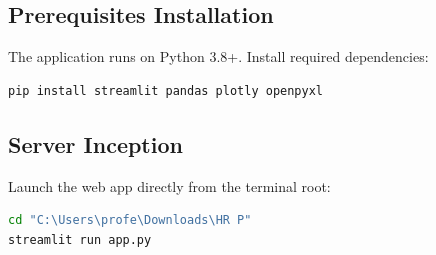 \documentclass[11pt,a4paper]{article}
\begin{document}
\subsection{Prerequisites Installation}
The application runs on Python 3.8+. Install required dependencies:
\begin{lstlisting}[language=bash]
pip install streamlit pandas plotly openpyxl
\end{lstlisting}

\subsection{Server Inception}
Launch the web app directly from the terminal root:
\begin{lstlisting}[language=bash]
cd "C:\Users\profe\Downloads\HR P"
streamlit run app.py
\end{lstlisting}
\end{document}
